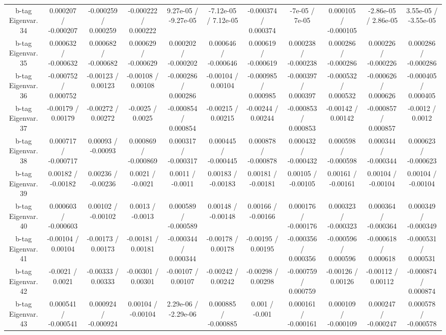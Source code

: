 \begin{table}[htbp]
\begin{center}
\begin{tabular}{|c|c|c|c|c|c|c|c|c|c|c|}
  b-tag Eigenvar. 34 & 0.000207 / -0.000207 & -0.000259 / 0.000259 & -0.000222 / 0.000222 & 9.27e-05 / -9.27e-05 & -7.12e-05 / 7.12e-05 & -0.000374 / 0.000374 & -7e-05 / 7e-05 & 0.000105 / -0.000105 & -2.86e-05 / 2.86e-05 & 3.55e-05 / -3.55e-05 \\ 
  b-tag Eigenvar. 35 & 0.000632 / -0.000632 & 0.000682 / -0.000682 & 0.000629 / -0.000629 & 0.000202 / -0.000202 & 0.000646 / -0.000646 & 0.000619 / -0.000619 & 0.000238 / -0.000238 & 0.000286 / -0.000286 & 0.000226 / -0.000226 & 0.000286 / -0.000286 \\ 
  b-tag Eigenvar. 36 & -0.000752 / 0.000752 & -0.00123 / 0.00123 & -0.00108 / 0.00108 & -0.000286 / 0.000286 & -0.00104 / 0.00104 & -0.000985 / 0.000985 & -0.000397 / 0.000397 & -0.000532 / 0.000532 & -0.000626 / 0.000626 & -0.000405 / 0.000405 \\ 
  b-tag Eigenvar. 37 & -0.00179 / 0.00179 & -0.00272 / 0.00272 & -0.0025 / 0.0025 & -0.000854 / 0.000854 & -0.00215 / 0.00215 & -0.00244 / 0.00244 & -0.000853 / 0.000853 & -0.00142 / 0.00142 & -0.000857 / 0.000857 & -0.0012 / 0.0012 \\ 
  b-tag Eigenvar. 38 & 0.000717 / -0.000717 & 0.00093 / -0.00093 & 0.000869 / -0.000869 & 0.000317 / -0.000317 & 0.000445 / -0.000445 & 0.000878 / -0.000878 & 0.000432 / -0.000432 & 0.000598 / -0.000598 & 0.000344 / -0.000344 & 0.000623 / -0.000623 \\ 
  b-tag Eigenvar. 39 & 0.00182 / -0.00182 & 0.00236 / -0.00236 & 0.0021 / -0.0021 & 0.0011 / -0.0011 & 0.00183 / -0.00183 & 0.00181 / -0.00181 & 0.00105 / -0.00105 & 0.00161 / -0.00161 & 0.00104 / -0.00104 & 0.00104 / -0.00104 \\ 
  b-tag Eigenvar. 40 & 0.000603 / -0.000603 & 0.00102 / -0.00102 & 0.0013 / -0.0013 & 0.000589 / -0.000589 & 0.00148 / -0.00148 & 0.00166 / -0.00166 & 0.000176 / -0.000176 & 0.000323 / -0.000323 & 0.000364 / -0.000364 & 0.000349 / -0.000349 \\ 
  b-tag Eigenvar. 41 & -0.00104 / 0.00104 & -0.00173 / 0.00173 & -0.00181 / 0.00181 & -0.000344 / 0.000344 & -0.00178 / 0.00178 & -0.00195 / 0.00195 & -0.000356 / 0.000356 & -0.000596 / 0.000596 & -0.000618 / 0.000618 & -0.000531 / 0.000531 \\ 
  b-tag Eigenvar. 42 & -0.0021 / 0.0021 & -0.00333 / 0.00333 & -0.00301 / 0.00301 & -0.00107 / 0.00107 & -0.00242 / 0.00242 & -0.00298 / 0.00298 & -0.000759 / 0.000759 & -0.00126 / 0.00126 & -0.00112 / 0.00112 & -0.000874 / 0.000874 \\ 
  b-tag Eigenvar. 43 & 0.000541 / -0.000541 & 0.000924 / -0.000924 & 0.00104 / -0.00104 & 2.29e-06 / -2.29e-06 & 0.000885 / -0.000885 & 0.001 / -0.001 & 0.000161 / -0.000161 & 0.000109 / -0.000109 & 0.000247 / -0.000247 & 0.000578 / -0.000578 \\ 

\end{tabular}
\end{center}
\end{table}
